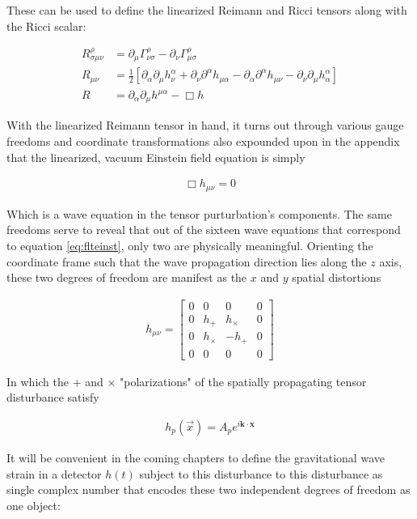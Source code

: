 These can be used to define the linearized Reimann and Ricci tensors along with the Ricci scalar:

\begin{align}
R^{\rho}_{\sigma \mu \nu} &= \partial_{\mu}\Gamma^{\rho}_{\nu \sigma} - \partial_{\nu}\Gamma^{\rho}_{\mu \sigma} \\ 
R_{\mu \nu} &= \frac{1}{2}\left[\partial_{\alpha}\partial_{\mu}h^{\alpha}_{\nu} + \partial_{\nu}\partial^{\alpha}h_{\mu \alpha} - \partial_{\alpha}\partial^{\alpha}h_{\mu \nu} - \partial_{\nu}\partial_{\mu}h^{\alpha}_{\alpha}\right] \\ \label{eq:linricci} 
R &= \partial_{\alpha}\partial_{\mu}h^{\mu \alpha} - \Box h
\end{align}

With the linearized Reimann tensor in hand, it turns out through various gauge freedoms and coordinate transformations also expounded upon in the appendix that the linearized, vacuum Einstein field equation is simply 

\begin{align}\label{eq:flteinst}
\Box h_{\mu \nu} = 0
\end{align}

Which is a wave equation in the tensor purturbation's components. The same freedoms serve to reveal that out of the sixteen wave equations that correspond to equation \ref{eq:flteinst}, only two are physically meaningful. Orienting the coordinate frame such that the wave propagation direction lies along the $z$ axis, these two degrees of freedom are manifest as the $x$ and $y$ spatial distortions

\begin{align}
h_{\mu \nu} = 
\begin{bmatrix}
0 & 0 & 0 & 0 \\
0 & h_+ & h_\times & 0 \\
0 & h_\times & -h_+ & 0 \\
0 & 0 & 0 & 0
\end{bmatrix}
\end{align}  

In which the $+$ and $\times$ "polarizations" of the spatially propagating tensor disturbance satisfy

\begin{align}
h_p(\vec{x}) = A_p e^{i \mathbf{k}\cdot\mathbf{x}}
\end{align}

It will be convenient in the coming chapters to define the gravitational wave strain in a detector $h(t)$ subject to this disturbance to this disturbance as single complex number that encodes these two independent degrees of freedom as one object:

